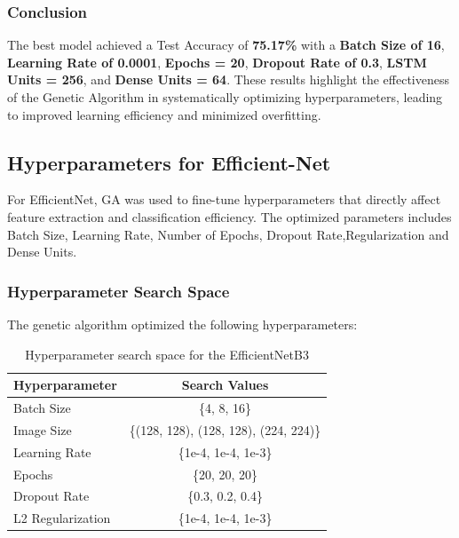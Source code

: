 \subsubsection{Conclusion}
The best model achieved a Test Accuracy of \textbf{75.17\%} with a \textbf{Batch Size of 16}, \textbf{Learning Rate of 0.0001}, \textbf{Epochs = 20}, \textbf{Dropout Rate of 0.3}, \textbf{LSTM Units = 256}, and \textbf{Dense Units = 64}. These results highlight the effectiveness of the Genetic Algorithm in systematically optimizing hyperparameters, leading to improved learning efficiency and minimized overfitting.


\subsection{Hyperparameters for Efficient-Net}
For EfficientNet, GA was used to fine-tune hyperparameters that directly affect feature extraction and classification efficiency. The optimized parameters includes Batch Size, Learning Rate, Number of Epochs, Dropout Rate,Regularization and Dense Units.

\subsubsection{Hyperparameter Search Space}
The genetic algorithm optimized the following hyperparameters:
\begin{table}[h]
      \centering
      \begin{tabular}{|l|c|}
          \hline
          \textbf{Hyperparameter} & \textbf{Search Values} \\
          \hline
          Batch Size & \{4, 8, 16\} \\
          Image Size & \{(128, 128), (128, 128), (224, 224)\} \\
          Learning Rate & \{1e-4, 1e-4, 1e-3\} \\
          Epochs & \{20, 20, 20\} \\
          Dropout Rate & \{0.3, 0.2, 0.4\} \\
          L2 Regularization & \{1e-4, 1e-4, 1e-3\} \\
          \hline
      \end{tabular}
      \caption{Hyperparameter search space for the EfficientNetB3}
      \label{tab:search_space}
  \end{table}
  
